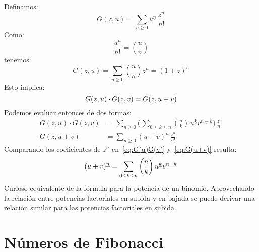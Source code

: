   Definamos:
  \begin{equation*}
    G(z, u)
      = \sum_{n \ge 0} u^{\underline{n}} \, \frac{z^n}{n!}
  \end{equation*}
  Como:
  \begin{equation*}
    \frac{u^{\underline{n}}}{n!}
      = \binom{u}{n}
  \end{equation*}
  tenemos:
  \begin{equation*}
    G(z, u)
      = \sum_{n \ge 0} \binom{u}{n} z^n
      = (1 + z)^u
  \end{equation*}
  Esto implica:
  \begin{equation*}
    G(z, u) \cdot G(z, v)
      = G(z, u + v) \\
  \end{equation*}
  Podemos evaluar entonces de dos formas:
  \begin{align}
    G(z, u) \cdot G(z, v)
      &= \sum_{n \ge 0}
	   \biggl( \,
	     \sum_{0 \le k \le n}
	       \binom{n}{k}
		 \, u^{\underline{k}} v^{\underline{n - k}}
	   \biggr) \, \frac{z^n}{n!}
	       \label{eq:G(u)G(v)}\\
    G(z, u + v)
      &= \sum_{n \ge 0} (u + v)^{\underline{n}} \, \frac{z^n}{n!}
	       \label{eq:G(u+v)}
  \end{align}
  Comparando los coeficientes de \(z^n\)
  en~\eqref{eq:G(u)G(v)} y~\eqref{eq:G(u+v)} resulta:
  \begin{equation}
    \index{binomio, teorema del!potencias factoriales}
    \label{eq:binomial-falling}
    (u + v)^{\underline{n}}
      = \sum_{0 \le k \le n}
	  \binom{n}{k} \, u^{\underline{k}} v^{\underline{n - k}}
  \end{equation}
  Curioso equivalente de la fórmula
  para la potencia de un binomio.
  Aprovechando la relación
  entre potencias factoriales en subida y en bajada
  se puede derivar una relación similar
  para las potencias factoriales en subida.

\section{Números de Fibonacci}
\label{sec:Fibonacci}


